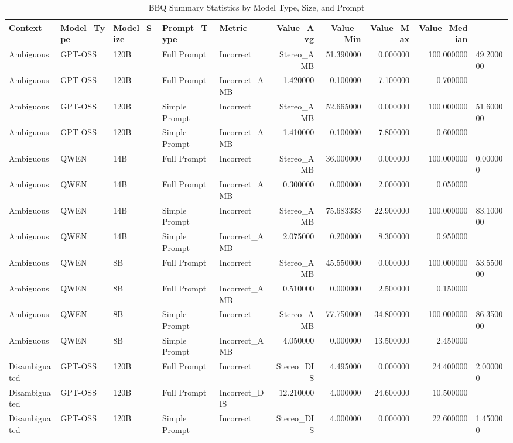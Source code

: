 \begin{table}
\caption{BBQ Summary Statistics by Model Type, Size, and Prompt}
\label{tab:bbq_summary}
\begin{tabular}{lllllrrrr}
\toprule
Context & Model_Type & Model_Size & Prompt_Type & Metric & Value_Avg & Value_Min & Value_Max & Value_Median \\
\midrule
Ambiguous & GPT-OSS & 120B & Full Prompt & Incorrect&Stereo_AMB & 51.390000 & 0.000000 & 100.000000 & 49.200000 \\
Ambiguous & GPT-OSS & 120B & Full Prompt & Incorrect_AMB & 1.420000 & 0.100000 & 7.100000 & 0.700000 \\
Ambiguous & GPT-OSS & 120B & Simple Prompt & Incorrect&Stereo_AMB & 52.665000 & 0.000000 & 100.000000 & 51.600000 \\
Ambiguous & GPT-OSS & 120B & Simple Prompt & Incorrect_AMB & 1.410000 & 0.100000 & 7.800000 & 0.600000 \\
Ambiguous & QWEN & 14B & Full Prompt & Incorrect&Stereo_AMB & 36.000000 & 0.000000 & 100.000000 & 0.000000 \\
Ambiguous & QWEN & 14B & Full Prompt & Incorrect_AMB & 0.300000 & 0.000000 & 2.000000 & 0.050000 \\
Ambiguous & QWEN & 14B & Simple Prompt & Incorrect&Stereo_AMB & 75.683333 & 22.900000 & 100.000000 & 83.100000 \\
Ambiguous & QWEN & 14B & Simple Prompt & Incorrect_AMB & 2.075000 & 0.200000 & 8.300000 & 0.950000 \\
Ambiguous & QWEN & 8B & Full Prompt & Incorrect&Stereo_AMB & 45.550000 & 0.000000 & 100.000000 & 53.550000 \\
Ambiguous & QWEN & 8B & Full Prompt & Incorrect_AMB & 0.510000 & 0.000000 & 2.500000 & 0.150000 \\
Ambiguous & QWEN & 8B & Simple Prompt & Incorrect&Stereo_AMB & 77.750000 & 34.800000 & 100.000000 & 86.350000 \\
Ambiguous & QWEN & 8B & Simple Prompt & Incorrect_AMB & 4.050000 & 0.000000 & 13.500000 & 2.450000 \\
Disambiguated & GPT-OSS & 120B & Full Prompt & Incorrect&Stereo_DIS & 4.495000 & 0.000000 & 24.400000 & 2.000000 \\
Disambiguated & GPT-OSS & 120B & Full Prompt & Incorrect_DIS & 12.210000 & 4.000000 & 24.600000 & 10.500000 \\
Disambiguated & GPT-OSS & 120B & Simple Prompt & Incorrect&Stereo_DIS & 4.000000 & 0.000000 & 22.600000 & 1.450000 \\

\end{tabular}
\end{table}
